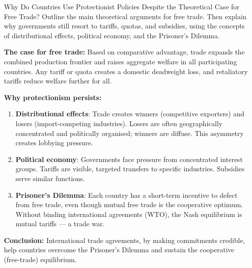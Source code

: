 \documentclass[paper=a5]{scrartcl}
\begin{document}
\begin{question}[type=open]{Why Do Countries Use Protectionist Policies Despite the
  Theoretical Case for Free Trade?}
Outline the main theoretical arguments for free trade. Then explain why
governments still resort to tariffs, quotas, and subsidies, using the
concepts of distributional effects, political economy, and the Prisoner's
Dilemma.

\answerlines[8]

\begin{solution}
  \textbf{The case for free trade:} Based on comparative advantage, trade
  expands the combined production frontier and raises aggregate welfare in all
  participating countries. Any tariff or quota creates a domestic deadweight
  loss, and retaliatory tariffs reduce welfare further for all.

  \textbf{Why protectionism persists:}
  \begin{enumerate}
    \item \textbf{Distributional effects}: Trade creates winners (competitive
      exporters) and losers (import-competing industries). Losers are often
      geographically concentrated and politically organised; winners are
      diffuse. This asymmetry creates lobbying pressure.

    \item \textbf{Political economy}: Governments face pressure from
      concentrated interest groups. Tariffs are visible, targeted transfers to
      specific industries. Subsidies serve similar functions.

    \item \textbf{Prisoner's Dilemma}: Each country has a short-term incentive
      to defect from free trade, even though mutual free trade is the
      cooperative optimum. Without binding international agreements (WTO), the
      Nash equilibrium is mutual tariffs — a trade war.
  \end{enumerate}

  \textbf{Conclusion:} International trade agreements, by making commitments
  credible, help countries overcome the Prisoner's Dilemma and sustain
  the cooperative (free-trade) equilibrium.
\end{solution}
\end{question}
\end{document}
